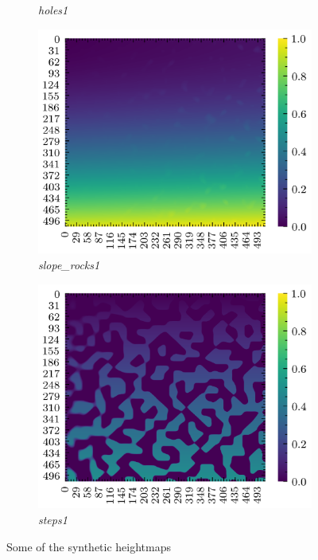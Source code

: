 \documentclass[../document.tex]{subfiles}
\begin{document}
\begin{figure}[H]
\begin{subfigure}[b]{0.45\linewidth}
            \caption{\emph{holes1}}
            \end{subfigure}    
          \begin{subfigure}[b]{0.45\textwidth}
            \includegraphics[width=\textwidth]{../img/hm/slope_rocks1.png}
            \caption{\emph{slope\_rocks1}}
        \end{subfigure}    
        \begin{subfigure}[b]{0.45\textwidth}
            \includegraphics[width=\textwidth]{../img/hm/steps1.png}
            \caption{\emph{steps1}}
        \end{subfigure}    
    \label{fig: heightmaps}
    \caption{Some of the synthetic heightmaps}
\end{figure}
\end{document}
